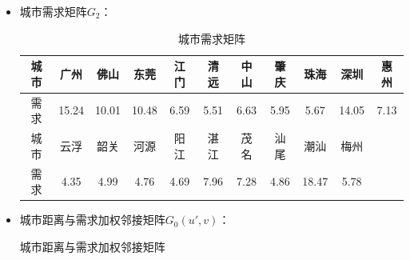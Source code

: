 \documentclass[UTF8,12pt]{ctexart}
\begin{document}
\begin{enumerate}
\begin{itemize}
\begin{table}[H]
{\begin{scriptsize}
                    \end{scriptsize}
                }
                \end{table}

                        \item 城市需求矩阵$G_2$：
      \begin{table}[htbp]
        \centering
        \caption{城市需求矩阵}
          \begin{tabular}{ccccccccccc}
          \toprule
          城市     & 广州     & 佛山     & 东莞     & 江门     & 清远     & 中山     & 肇庆     & 珠海     & 深圳     & 惠州 \\
          \midrule
          需求     & 15.24  & 10.01  & 10.48  & 6.59   & 5.51   & 6.63   & 5.95   & 5.67   & 14.05  & 7.13  \\
          \midrule
          城市     & 云浮     & 韶关     & 河源     & 阳江     & 湛江     & 茂名     & 汕尾     & 潮汕     & 梅州     &  \\
          \midrule
          需求     & 4.35   & 4.99   & 4.76   & 4.69   & 7.96   & 7.28   & 4.86   & 18.47  & 5.78   &  \\
          \bottomrule
          \end{tabular}%
      \end{table}%

                        \item 城市距离与需求加权邻接矩阵$G_{0}(u',v)$：
      \begin{table}[H]
        \caption{城市距离与需求加权邻接矩阵}
        \makebox[35em][c]{
            \begin{tiny}
              

\end{tiny}}
\end{table}
\end{itemize}
\end{enumerate}
\end{document}
